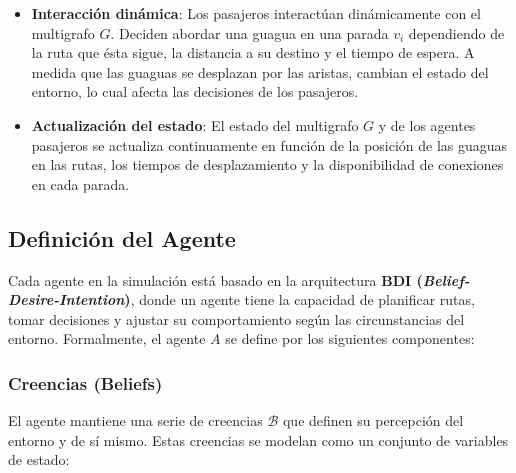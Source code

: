 \documentclass[a4paper,12pt]{article}
\begin{document}
\begin{itemize}
    \item \textbf{Interacción dinámica}: Los pasajeros interactúan dinámicamente con el multigrafo $G$. Deciden abordar una guagua en una parada $v_i$ dependiendo de la ruta que ésta sigue, la distancia a su destino y el tiempo de espera. A medida que las guaguas se desplazan por las aristas, cambian el estado del entorno, lo cual afecta las decisiones de los pasajeros.
    
    \item \textbf{Actualización del estado}: El estado del multigrafo $G$ y de los agentes pasajeros se actualiza continuamente en función de la posición de las guaguas en las rutas, los tiempos de desplazamiento y la disponibilidad de conexiones en cada parada.
\end{itemize}


\subsection{Definición del Agente}
\label{sec:defagente}

Cada agente en la simulación está basado en la arquitectura \textbf{BDI (\textit{Belief-Desire-Intention})}, donde un agente tiene la capacidad de planificar rutas, tomar decisiones y ajustar su comportamiento según las circunstancias del entorno. Formalmente, el agente $A$ se define por los siguientes componentes:

\subsubsection{Creencias (Beliefs)}

El agente mantiene una serie de creencias $\mathcal{B}$ que definen su percepción del entorno y de sí mismo. Estas creencias se modelan como un conjunto de variables de estado:
\end{document}
